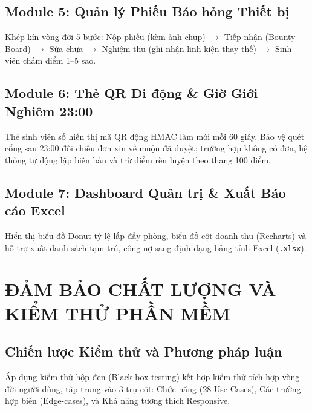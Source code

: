 \documentclass[12pt,a4paper,oneside]{report}
\begin{document}
\section{Module 5: Quản lý Phiếu Báo hỏng Thiết bị}
Khép kín vòng đời 5 bước: Nộp phiếu (kèm ảnh chụp) $\rightarrow$ Tiếp nhận (Bounty Board) $\rightarrow$ Sửa chữa $\rightarrow$ Nghiệm thu (ghi nhận linh kiện thay thế) $\rightarrow$ Sinh viên chấm điểm 1--5 sao.

\section{Module 6: Thẻ QR Di động \& Giờ Giới Nghiêm 23:00}
Thẻ sinh viên số hiển thị mã QR động HMAC làm mới mỗi 60 giây. Bảo vệ quét cổng sau 23:00 đối chiếu đơn xin về muộn đã duyệt; trường hợp không có đơn, hệ thống tự động lập biên bản và trừ điểm rèn luyện theo thang 100 điểm.

\section{Module 7: Dashboard Quản trị \& Xuất Báo cáo Excel}
Hiển thị biểu đồ Donut tỷ lệ lấp đầy phòng, biểu đồ cột doanh thu (Recharts) và hỗ trợ xuất danh sách tạm trú, công nợ sang định dạng bảng tính Excel (\texttt{.xlsx}).

\chapter{ĐẢM BẢO CHẤT LƯỢNG VÀ KIỂM THỬ PHẦN MỀM}
\label{ch:testing}

\section{Chiến lược Kiểm thử và Phương pháp luận}
Áp dụng kiểm thử hộp đen (Black-box testing) kết hợp kiểm thử tích hợp vòng đời người dùng, tập trung vào 3 trụ cột: Chức năng (28 Use Cases), Các trường hợp biên (Edge-cases), và Khả năng tương thích Responsive.
\end{document}
